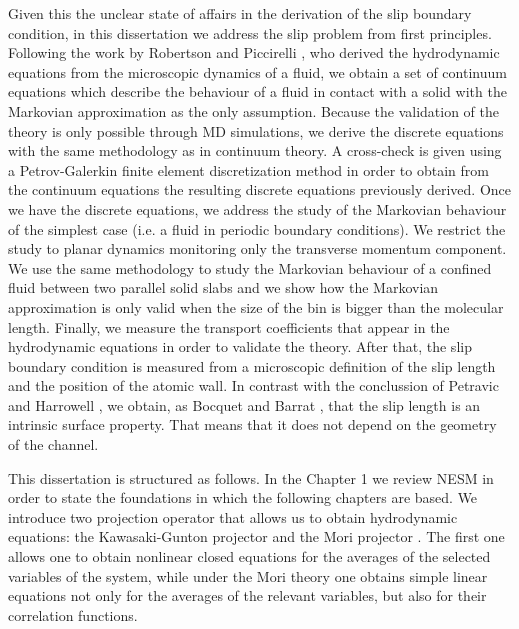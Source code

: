 \documentclass[b5paper,openright,10pt]{book}
\begin{document}
Given this the unclear state of affairs in the derivation of the slip boundary condition, in this dissertation we address the slip problem from first principles. Following the work by Robertson \cite{Robertson1966} and Piccirelli \cite{Piccirelli1968}, who derived the hydrodynamic equations from the microscopic dynamics of a fluid, we obtain a set of continuum equations which describe the behaviour of a fluid in contact with a solid with the Markovian approximation as the only assumption. 
Because the validation of the theory is only possible through MD simulations, we derive the discrete equations with the same methodology as in continuum theory. 
A cross-check is given using a Petrov-Galerkin  finite element discretization method in order to obtain from the continuum equations the resulting discrete equations previously derived.  
Once we have the discrete equations, we address the study of the Markovian behaviour of the simplest case (i.e. a fluid in periodic boundary conditions). We restrict the study to planar dynamics monitoring only the transverse momentum component. We use the same methodology to study the Markovian behaviour of a confined fluid between two parallel solid slabs and we show how the Markovian approximation is only valid when the size of the bin is bigger than the molecular length. Finally, we measure the transport coefficients that appear in the hydrodynamic equations in order to validate the theory. 
After that, the slip boundary condition is measured from a microscopic definition of the slip length and the position of the atomic wall.
In contrast with the conclussion of Petravic and Harrowell \cite{Petravic2007}, we obtain, as Bocquet and Barrat \cite{Bocquet1994}, that the slip length is an intrinsic surface property. That means that it does not depend on the geometry of the channel. 

This dissertation is structured as follows. 
In the Chapter 1 we review NESM in order to state the foundations in which the following chapters are based. 
We introduce two projection operator that allows us to obtain hydrodynamic equations: the Kawasaki-Gunton projector \cite{Kawasaki1973} and the Mori projector \cite{Mori1965}.  The first one allows one to obtain  nonlinear closed equations
for  the  averages  of   the  selected  variables of the system, while under the Mori theory one obtains simple linear equations not only for the averages of the relevant variables, but also for their correlation functions. 
\end{document}
